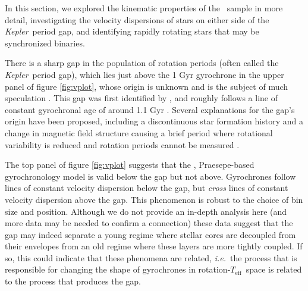 \documentclass{aastex63}
\newcommand{\ie}{{\it i.e.}}
\newcommand{\kepler}{{\it Kepler}}
\newcommand{\teff}{$T_{\mathrm{eff}}$}
\newcommand{\mct}{\citet{mcquillan2014}}
\newcommand{\racomment}[1]{{\color{blue}#1}}
\begin{document}
In this section, we explored the kinematic properties of the \mct\ sample in
more detail, investigating the velocity dispersions of stars on either side of
the \kepler\ period gap, and identifying rapidly rotating stars that may be
synchronized binaries.

There is a sharp gap in the population of rotation periods (often called the
\kepler\ period gap), which lies just above the 1 Gyr gyrochrone in the upper
panel of figure \ref{fig:vplot}, whose origin is unknown and is the subject of
much speculation \citep{mcquillan2014, davenport2017, davenport2018,
reinhold2019, reinhold2020}.
This gap was first identified by \mct, and roughly follows a line of constant
gyrochronal age of around 1.1 Gyr \citep[according to the][gyrochronology
relation]{angus2019}.
Several explanations for the gap's origin have been proposed, including a
discontinuous star formation history \citep{mcquillan2013, davenport2017,
davenport2018} and a change in magnetic field structure causing a brief period
where rotational variability is reduced and rotation periods cannot be
measured \citep{reinhold2019, reinhold2020}.

The top panel of figure \ref{fig:vplot} suggests that the \citet{angus2019},
Praesepe-based gyrochronology model is valid below the gap but not above.
Gyrochrones follow lines of constant velocity dispersion below the gap, but
{\it cross} lines of constant velocity dispersion above the gap.
This phenomenon is robust to the choice of bin size and position.
Although we do not provide an in-depth analysis here (and more data may be
needed to confirm a connection) these data suggest that the gap may indeed
separate a young regime where stellar cores are decoupled from their envelopes
from an old regime where these layers are more tightly coupled.
If so, this could indicate that \racomment{these phenomena are related, \ie\
the process that is responsible for changing the shape of gyrochrones in
rotation-\teff\ space is related to the process that produces the gap.
}
\end{document}
